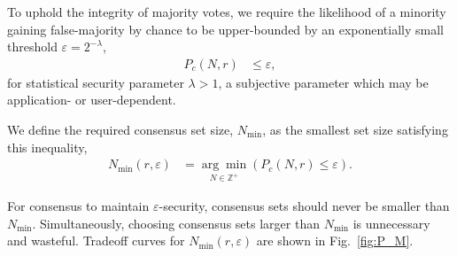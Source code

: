 To uphold the integrity of majority votes, we require the likelihood of a minority gaining false-majority by chance to be upper-bounded by an exponentially small threshold $\varepsilon = 2^{-\lambda}$,
\begin{align}
	P_c(N,r) & \leq\varepsilon,
\end{align}
for statistical security parameter $\lambda>1$, a subjective parameter which may be application- or user-dependent. %

We define the required consensus set size, $N_\mathrm{min}$, as the smallest set size satisfying this inequality,
\begin{align}
	N_\mathrm{min}(r,\varepsilon) & = \underset{N\in\mathbb{Z}^+}{\arg\min}(P_c(N,r)\leq\varepsilon).
\end{align}

For consensus to maintain $\varepsilon$-security, consensus sets should never be smaller than $N_\mathrm{min}$. Simultaneously, choosing consensus sets larger than $N_\mathrm{min}$ is unnecessary and wasteful. Tradeoff curves for $N_\mathrm{min}(r,\varepsilon)$ are shown in Fig.~\ref{fig:P_M}.


